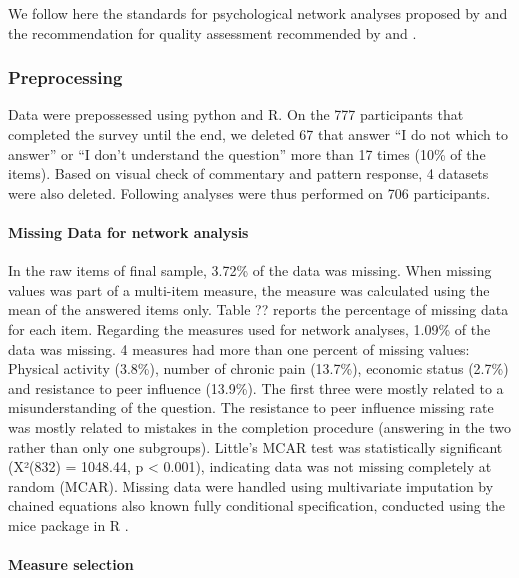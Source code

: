 \documentclass[preprint, 3p,
authoryear]{elsarticle} %
\begin{document}
We follow here the standards for psychological network analyses proposed
by \citet{burger_reporting_2022} and the recommendation for quality
assessment recommended by \citet{tomei_network_2022} and
\citet{monteleone_systematic_2021}.

\hypertarget{preprocessing}{%
\subsubsection{Preprocessing}\label{preprocessing}}

Data were prepossessed using python and R. On the 777 participants that
completed the survey until the end, we deleted 67 that answer ``I do not
which to answer'' or ``I don't understand the question'' more than 17
times (10\% of the items). Based on visual check of commentary and
pattern response, 4 datasets were also deleted. Following analyses were
thus performed on 706 participants.

\hypertarget{missing-data-for-network-analysis}{%
\paragraph{Missing Data for network
analysis}\label{missing-data-for-network-analysis}}

In the raw items of final sample, 3.72\% of the data was missing. When
missing values was part of a multi-item measure, the measure was
calculated using the mean of the answered items only. Table ?? reports
the percentage of missing data for each item. Regarding the measures
used for network analyses, 1.09\% of the data was missing. 4 measures
had more than one percent of missing values: Physical activity (3.8\%),
number of chronic pain (13.7\%), economic status (2.7\%) and resistance
to peer influence (13.9\%). The first three were mostly related to a
misunderstanding of the question. The resistance to peer influence
missing rate was mostly related to mistakes in the completion procedure
(answering in the two rather than only one subgroups). Little's MCAR
test was statistically significant (X²(832) = 1048.44, p \textless{}
0.001), indicating data was not missing completely at random (MCAR).
Missing data were handled using multivariate imputation by chained
equations also known fully conditional specification, conducted using
the mice package in R \citep{buuren_mice_2011}.

\hypertarget{measure-selection}{%
\paragraph{Measure selection}\label{measure-selection}}
\end{document}
